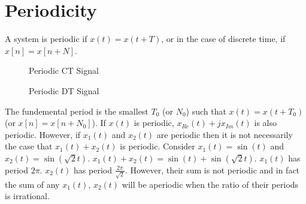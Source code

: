 \section{Periodicity}

A system is periodic if $x(t) = x(t + T)$, or 
in the case of discrete time, if $x[n] = x[n + N]$. 


\begin{figure}
    \centering
    \caption{Periodic CT Signal}
\end{figure}
    
\begin{figure}
    \centering
    \caption{Periodic DT Signal}
\end{figure}

The fundemental period is the smallest $T_0$ (or $N_0$) such 
that $x(t) = x(t + T_0)$ (or $x[n] = x[n + N_0]$). If $x(t)$ is periodic, $x_{Re}(t) + j x_{Im}(t)$ is also 
periodic. However, if $x_1(t)$ and $x_2(t)$ are periodic then it is not 
necessarily the case that $x_1(t) + x_2(t)$ is 
periodic. Consider $x_1(t) = \sin(t)$ and 
$x_2(t) = \sin(\sqrt{2} t)$. $x_1(t) + x_2(t) = \sin(t) + \sin(\sqrt{2}t)$.
$x_1(t)$ has period $2\pi$. $x_2(t)$ has period $\frac{2\pi}{\sqrt{2}}$. 
However, their sum is not periodic and in fact the sum of 
any $x_1(t)$, $x_2(t)$ will be aperiodic when the ratio 
of their periods is irrational. 

